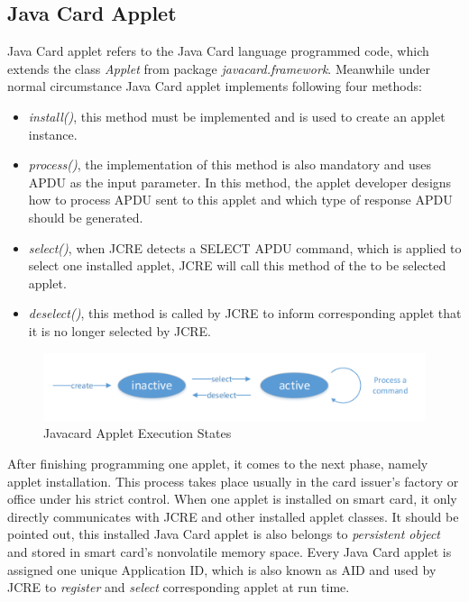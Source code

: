 \subsection{Java Card Applet}
Java Card applet refers to the Java Card language programmed code, which extends the class \emph{Applet} from package \emph{javacard.framework}. Meanwhile under normal circumstance Java Card applet implements following four methods:
\begin{itemize}
\item\emph{install()}, this method must be implemented and is used to create an applet instance.
\item\emph{process()}, the implementation of this method is also mandatory and uses APDU as the input parameter. In this method, the applet developer designs how to process APDU sent to this applet and which type of response APDU should be generated.
\item \emph{select()}, when JCRE detects a SELECT APDU command, which is applied to select one installed applet, JCRE will call this method of the to be selected applet.
\item  \emph{deselect()}, this method is called by JCRE to inform corresponding applet that it is no longer selected by JCRE.
\end{itemize}

\begin{figure}[!htbp]
	\centering
	\includegraphics[width=1\textwidth]{applet-execution-states}
		\caption{Javacard Applet Execution States \cite{handbuch}}
	\label{fig:applet-execution-states}
\end{figure}
After finishing programming one applet, it comes to the next phase, namely applet installation. This process takes place usually in the card issuer's factory or office under his strict control. When one applet is installed on smart card, it only directly communicates with JCRE and other installed applet classes. It should be pointed out, this installed Java Card applet is also belongs to \emph{persistent object} and stored in smart card's nonvolatile memory space. Every Java Card applet is assigned one unique Application ID, which is also known as AID and used by JCRE to \emph{register} and \emph{select} corresponding applet at run time.

